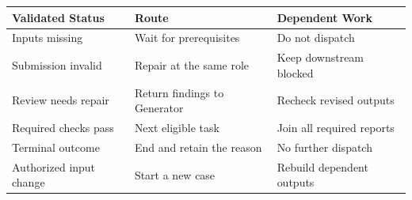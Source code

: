 \begin{tabular}{@{}P{3.6cm}P{4.2cm}P{4.7cm}@{}}
\toprule
\textbf{Validated Status} & \textbf{Route} & \textbf{Dependent Work} \\
\midrule
Inputs missing & Wait for prerequisites & Do not dispatch \\
Submission invalid & Repair at the same role & Keep downstream blocked \\
Review needs repair & Return findings to Generator & Recheck revised outputs \\
Required checks pass & Next eligible task & Join all required reports \\
Terminal outcome & End and retain the reason & No further dispatch \\
Authorized input change & Start a new case & Rebuild dependent outputs \\
\bottomrule
\end{tabular}
